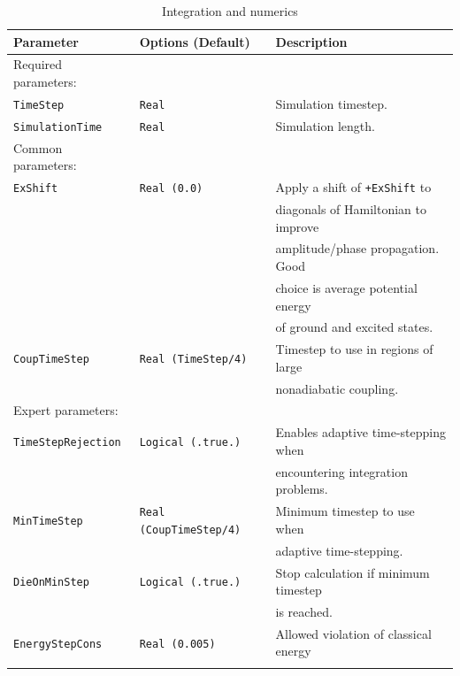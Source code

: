 \documentclass[11pt]{article}
\begin{document}
\clearpage
\newpage
\begin{table}[h]
\caption{Integration and numerics}
\begin{tabular}{ l l l }
\hline\hline
Parameter & Options (Default)& Description \\
\hline
Required parameters:\\
{\tt TimeStep}          & {\tt Real}                & {\small Simulation timestep.}\\
{\tt SimulationTime}    & {\tt Real}                & {\small Simulation length.}\\
Common parameters:\\
{\tt ExShift}           & {\tt Real (0.0)}          & {\small Apply a shift of {\tt +ExShift} to}\\&&
                                                      {\small diagonals of Hamiltonian to improve} \\&&
                                                      {\small amplitude/phase propagation. Good}\\&&
                                                      {\small choice is average potential energy}\\&&
                                                      {\small of ground and excited states.}\\
{\tt CoupTimeStep}      &{\tt Real (TimeStep/4)}    & {\small Timestep to use in regions of large}\\&&
                                                      {\small nonadiabatic coupling.}\\
Expert parameters:\\
{\tt TimeStepRejection} &{\tt Logical (.true.)}     & {\small Enables adaptive time-stepping when}\\&&
                                                      {\small encountering integration problems.}\\
{\tt MinTimeStep}       &{\tt Real (CoupTimeStep/4)}& {\small Minimum timestep to use when}\\&&
                                                      {\small adaptive time-stepping.}\\
{\tt DieOnMinStep}      & {\tt Logical (.true.)}    & {\small Stop calculation if minimum timestep}\\&&
                                                      {\small is reached.}\\
{\tt EnergyStepCons}    & {\tt Real (0.005)}        & {\small Allowed violation of classical energy}\\&&

\end{tabular}
\end{table}
\end{document}
